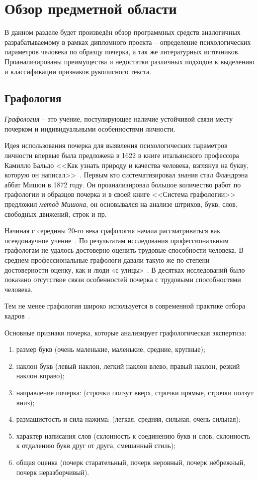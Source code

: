\section{Обзор предметной области}
\label{sec:domain:intro}

В данном разделе будет произведён обзор программных средств аналогичных разрабатываемому в рамках дипломного проекта – определение психологических параметров человека по образцу почерка, а так же литературных источников. Проанализированы преимущества и недостатки различных подходов к выделению и классификации признаков рукописного текста.

\subsection{Графология}
\label{sub:domain:grafologic}
\emph{Графология} – это учение, постулирующее наличие устойчивой связи месту почерком и индивидуальными особенностями личности.

Идея использования почерка для выявления психологических параметров личности впервые была предложена в 1622 в книге итальянского профессора Камилло Бальдо <<Как узнать природу и качества человека, взглянув на букву, которую он написал>>~\cite{kamillo_grafology}. Первым кто систематизировал знания стал Фландрэна аббат Мишон в 1872 году. Он проанализировал большое количество работ по графологии и образцов почерка и в своей книге <<Система графологии>> предложил \emph{метод Мишона}, он основывался на анализе штрихов, букв, слов, свободных движений, строк и пр.~\cite{mishon_grafology}

Начиная с середины 20-го века графология начала рассматриваться как псевдонаучное учение~\cite{graphology_wiki}. По результатам исследования профессиональным графологам не удалось достоверно оценить трудовые способности человека. В среднем профессиональные графологи давали такую же по степени достоверности оценку, как и люди «с улицы»~\cite{neter_shakhar_psevdograph, king_koehler_psevdograph}. В десятках исследований было показано отсутствие связи особенностей почерка с трудовыми способностями человека.

Тем не менее графология широко используется в современной практике отбора кадров~\cite{graphology_psyfactor}.

Основные признаки почерка, которые анализирует графологическая экспертиза:
\begin{enumerate}
  \item размер букв (очень маленькие, маленькие, средние, крупные);
  \item наклон букв (левый наклон, легкий наклон влево, правый наклон, резкий наклон вправо);
  \item направление почерка: (строчки ползут вверх, строчки прямые,  строчки ползут вниз);
  \item размашистость и сила нажима: (легкая, средняя, сильная, очень сильная);
  \item характер написания слов (склонность к соединению букв и слов, склонность к отдалению букв друг от друга, смешанный стиль);
  \item общая оценка (почерк старательный, почерк неровный, почерк небрежный, почерк неразборчивый).
\end{enumerate}

